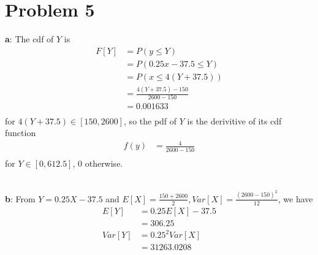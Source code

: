 \documentclass[12pt,letterpaper]{article}
\begin{document}
\section*{Problem 5}
    \textbf{a}: The cdf of $Y$ is
        \begin{equation*}
            \begin{aligned}
                F[Y] &= P(y \leq Y) \\
                &= P(0.25x - 37.5 \leq Y) \\
                &= P(x \leq 4(Y + 37.5)) \\
                &= \frac{4(Y + 37.5) - 150}{2600 - 150} \\
                &= 0.001633 \\
            \end{aligned}
        \end{equation*}
    for $4(Y + 37.5) \in [150, 2600]$, so the pdf of $Y$ is the derivitive of its cdf function
        \begin{equation*}
            \begin{aligned}
                f(y) &= \frac{4}{2600 - 150} \\
            \end{aligned}
        \end{equation*}
    for $Y \in [0, 612.5]$, 0 otherwise. \\
     \\
    \textbf{b}: From $Y = 0.25X - 37.5$ and $E[X] = \frac{150 + 2600}{2}, Var[X] = \frac{(2600 - 150)^{2}}{12}$, we have
        \begin{equation*}
            \begin{aligned}
                E[Y] &= 0.25E[X] - 37.5 \\
                &= 306.25 \\
                Var[Y] &= 0.25^{2}Var[X] \\
                &= 31263.0208 \\
            \end{aligned}
        \end{equation*}
\end{document}
